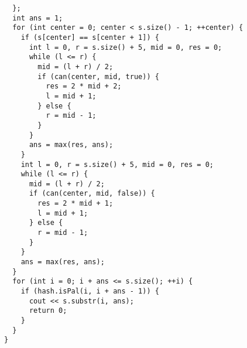 \documentclass[twoside]{article}
\begin{document}
\begin{multicols*}{2}
\begin{verbatim}
  };
  int ans = 1;
  for (int center = 0; center < s.size() - 1; ++center) {
    if (s[center] == s[center + 1]) {
      int l = 0, r = s.size() + 5, mid = 0, res = 0;
      while (l <= r) {
        mid = (l + r) / 2;
        if (can(center, mid, true)) {
          res = 2 * mid + 2;
          l = mid + 1;
        } else {
          r = mid - 1;
        }
      }
      ans = max(res, ans);
    }
    int l = 0, r = s.size() + 5, mid = 0, res = 0;
    while (l <= r) {
      mid = (l + r) / 2;
      if (can(center, mid, false)) {
        res = 2 * mid + 1;
        l = mid + 1;
      } else {
        r = mid - 1;
      }
    }
    ans = max(res, ans);
  }
  for (int i = 0; i + ans <= s.size(); ++i) {
    if (hash.isPal(i, i + ans - 1)) {
      cout << s.substr(i, ans);
      return 0;
    }
  }
}

\end{verbatim}

{
}
\end{multicols*}
\end{document}
